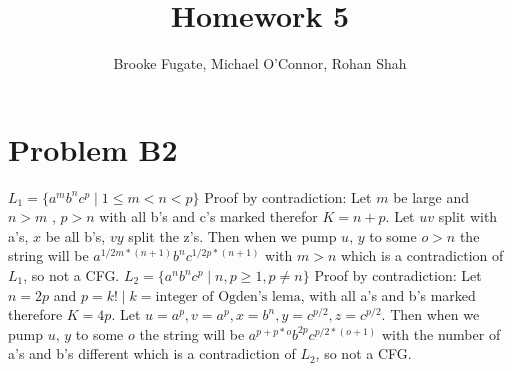\documentclass[12pt]{article}
\begin{document}
\pagestyle{plain}
\titleformat{\subsection}[runin]
  {\normalfont\large\bfseries}{\thesubsection}{1em}{}

\title{Homework 5}
\author{Brooke Fugate, Michael O'Connor, Rohan Shah}
\date{}

\maketitle

\section*{Problem B2}

\medskip
$L_{1} = \{a^mb^nc^p \mid 1 \leq m < n < p\}$\newline
Proof by contradiction:\newline
Let $m$ be large and $n > m$ , $p > n$ with all b's and c's marked therefor $K = n + p$.\newline
Let $u v$ split with a's, $x$ be all b's, $v y$ split the z's.  Then when we pump $u \text{, } y$ to some $o > n$ the string will be $a^{1/2m*(n + 1)}b^nc^{1/2p*(n + 1)}$ with $m > n$ which is a contradiction of $L_1$, so not a CFG.\newline\newline
\medskip
$L_{2} = \{a^nb^nc^p \mid n,p \geq 1, p \not= n\}$\newline
Proof by contradiction:\newline
Let $n = 2p$ and $p = k! \mid k = \text{integer of Ogden's lema}$, with all a's and b's marked therefore $K = 4p$.\newline
Let $u=a^p , v=a^p , x=b^n , y = c^{p/2} , z = c^{p/2} $.  Then when we pump $u \text{, } y$ to some $o$ the string will be $a^{p+p*o}b^{2p}c^{p/2*(o + 1)}$ with the number of a's and b's different which is a contradiction of $L_2$, so not a CFG.\newline
\end{document}
